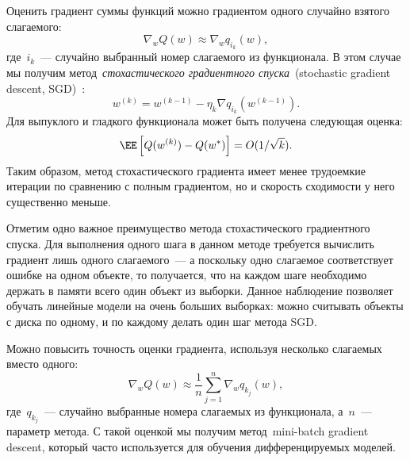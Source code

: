 \documentclass[12pt,fleqn]{article}
\begin{document}
Оценить градиент суммы функций можно градиентом одного случайно взятого слагаемого:
\[
    \nabla_w Q(w)
    \approx
    \nabla_w q_{i_k}(w),
\]
где~$i_k$~--- случайно выбранный номер слагаемого из функционала.
В этом случае мы получим метод~\emph{стохастического
градиентного спуска}~(stochastic gradient descent, SGD)~\cite{robbins51stochastic}:
\[
    w^{(k)} = w^{(k - 1)} - \eta_k \nabla q_{i_k}(w^{(k - 1)}).
\]
Для выпуклого и гладкого функционала может быть получена
следующая оценка:
\[
    \EE \left[
        Q(w^{(k)}) - Q(w^*)
    \right]
    =
    O(1 / \sqrt{k}).
\]
Таким образом, метод стохастического градиента имеет менее
трудоемкие итерации по сравнению с полным градиентом,
но и скорость сходимости у него существенно меньше.

Отметим одно важное преимущество метода стохастического градиентного спуска.
Для выполнения одного шага в данном методе требуется вычислить градиент лишь одного слагаемого~---
а поскольку одно слагаемое соответствует ошибке на одном объекте,
то получается, что на каждом шаге необходимо держать в памяти всего один объект из выборки.
Данное наблюдение позволяет обучать линейные модели на очень больших выборках:
можно считывать объекты с диска по одному, и по каждому делать один шаг метода SGD.

Можно повысить точность оценки градиента, используя несколько слагаемых вместо одного:
\[
    \nabla_w Q(w)
    \approx
    \frac{1}{n}
    \sum_{j = 1}^{n}
    \nabla_w q_{k_j}(w),
\]
где~$q_{k_j}$~--- случайно выбранные номера слагаемых из функционала,
а~$n$~--- параметр метода.
С такой оценкой мы получим метод~mini-batch gradient descent,
который часто используется для обучения дифференцируемых моделей.
\end{document}
